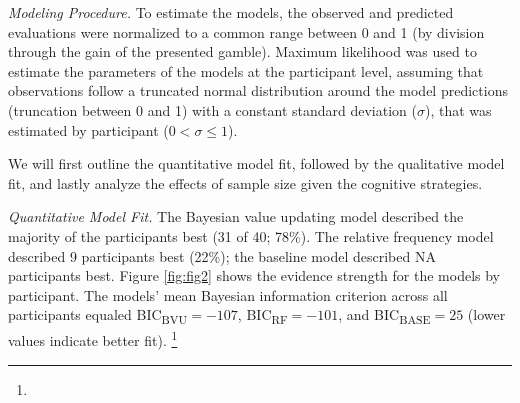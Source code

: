 \documentclass[
  a4paper, man, floatsintext]{apa6}
\begin{document}
\textit{Modeling Procedure.} To estimate the models, the observed and
predicted evaluations were normalized to a common range between 0 and 1
(by division through the gain of the presented gamble). Maximum
likelihood was used to estimate the parameters of the models at the
participant level, assuming that observations follow a truncated normal
distribution around the model predictions (truncation between 0 and 1)
with a constant standard deviation (\(\sigma\)), that was estimated by
participant (\(0 < \sigma \leq 1\)).

We will first outline the quantitative model fit, followed by the
qualitative model fit, and lastly analyze the effects of sample size
given the cognitive strategies.

\textit{Quantitative Model Fit.} The Bayesian value updating model
described the majority of the participants best (31 of 40; 78\%). The
relative frequency model described 9 participants best (22\%); the
baseline model described NA participants best. Figure \ref{fig:fig2}
shows the evidence strength for the models by participant. The models'
mean Bayesian information criterion across all participants equaled
BIC\textsubscript{BVU}\(= -107\), BIC\textsubscript{RF}\(= -101\), and
BIC\textsubscript{BASE}\(= 25\) (lower values indicate better fit).
\footnote{}
\end{document}
